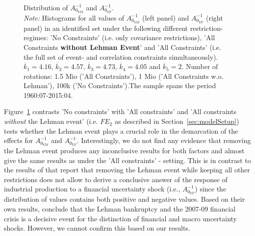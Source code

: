 \documentclass[a4paper,11pt,listof=nochaptergap,oneside,pointednumbers,bibtotoc,bigheadings,liststotoc,hidelinks]{scrbook}
\theoremstyle{mysatz}
\theoremstyle{mydefinition}
\theoremstyle{mytheorem}
\theoremstyle{mybemerkung}
\begin{document}
\begin{figure}[!h]
   \centering
   \setlength\fboxsep{0pt}
   \setlength\fboxrule{0pt}
      \caption[Distribution of $A_{0_{YM}}^{-1}$ and $A_{0_{YF}}^{-1}$.]{Distribution of $A_{0_{YM}}^{-1}$ and $A_{0_{YF}}^{-1}$.\\
      \textit{Note:} Histograms for all values of $A_{0_{YM}}^{-1}$ (left panel) and $A_{0_{YF}}^{-1}$ (right panel) in an identified set under the following different restriction-regimes: 'No Constraints' (i.e. only covariance restrictions), 'All Constraints \textbf{without Lehman Event}' and 'All Constraints' (i.e. the full set of event- and correlation constraints simultaneously). $\overline{k}_1 = 4.16$, $\overline{k}_2 = 4.57$, $\overline{k}_3 = 4.73$, $\overline{k}_4 = 4.05$ and $\overline{k}_5 = 2$. Number of rotations: 1.5 Mio ('All Constraints'), 1 Mio ('All Constraints w.o. Lehman'), 100k ('No Constraints').The sample spans the period 1960:07-2015:04.}   \label{fig:distribution_impact_matrices_type2}
\end{figure}

Figure~\ref{fig:distribution_impact_matrices_type2} contrasts 'No constraints' with 'All constraints' and 'All constraints \textit{without} the Lehman event' (i.e. $FE_2$ as described in Section~\ref{sec:modelSetup}) tests whether the Lehman event plays a crucial role in the demarcation of the effects for $A_{0_{YM}}^{-1}$ and $A_{0_{YF}}^{-1}$. Interestingly, we do not find any evidence that removing the Lehman event produces any inconclusive results for both factors and almost give the same results as under the 'All constraints' - setting. This is in contrast to the results of \citet{ludvigsonetal:19} that report that removing the Lehman event while keeping all other restrictions does not allow to derive a conclusive answer of the response of industrial production to a financial uncertainty shock (i.e., $A_{0_{YF}}^{-1}$) since the distribution of values contains both positive and negative values. Based on their own results, \citet{ludvigsonetal:19} conclude that the Lehman bankruptcy and the 2007-09 financial crisis is a decisive event for the distinction of financial and macro uncertainty shocks. However, we cannot confirm this based on our results.
\end{document}
